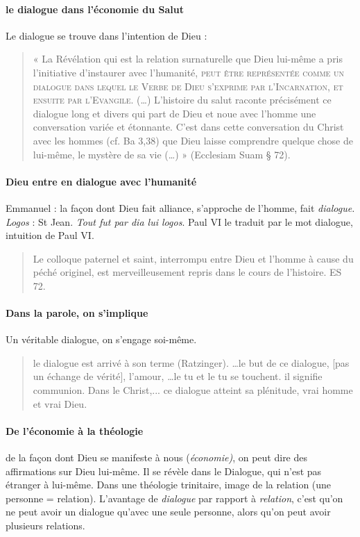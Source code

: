    \paragraph{le dialogue dans l'économie du Salut} Le dialogue se trouve dans l'intention de Dieu :
   \begin{quote}
       « La Révélation qui est la relation surnaturelle que Dieu lui-même a pris l’initiative d’instaurer avec l’humanité, \textsc{peut être représentée comme un dialogue dans lequel le Verbe de Dieu s’exprime par l’Incarnation, et ensuite par l’Evangile.} (…) L’histoire du salut raconte précisément ce dialogue long et divers qui part de Dieu et noue avec l’homme une conversation variée et étonnante. C’est dans cette conversation du Christ avec les hommes (cf. Ba 3,38) que Dieu laisse comprendre quelque chose de lui-même, le mystère de sa vie (…) » (Ecclesiam Suam § 72). 
   \end{quote}
   
  \paragraph{Dieu entre en dialogue avec l'humanité} Emmanuel : la façon dont Dieu fait alliance, s'approche de l'homme, fait \textit{dialogue.} 
  \emph{Logos} : St Jean. \textit{Tout fut par \emph{dia} lui \emph{logos}}. Paul VI le traduit par le mot dialogue, intuition de Paul VI. 
   \begin{quote}
       Le colloque paternel et saint, interrompu entre Dieu et l'homme à cause du péché originel, est merveilleusement repris dans le cours de l'histoire. ES 72.
   \end{quote}
   
   \paragraph{Dans la parole, on s'implique} Un véritable dialogue, on s'engage soi-même. 
   \begin{quote}
       le dialogue est arrivé à son terme (Ratzinger). \ldots le but de ce dialogue, [pas un échange de vérité], l'amour, \ldots le tu et le tu se touchent. il signifie communion. Dans le Christ,... ce dialogue atteint sa plénitude, vrai homme et vrai Dieu. 
   \end{quote}
   
   \paragraph{De l'économie à la théologie} de la façon dont Dieu se manifeste à nous (\textit{économie)}, on peut dire des affirmations sur Dieu lui-même.
   Il se révèle dans le Dialogue, qui n'est pas étranger à lui-même. Dans une théologie trinitaire, image de la relation (une personne = relation). L'avantage de \textit{dialogue} par rapport à \textit{relation}, c'est qu'on ne peut avoir un dialogue qu'avec une seule personne, alors qu'on peut avoir plusieurs relations.
   
